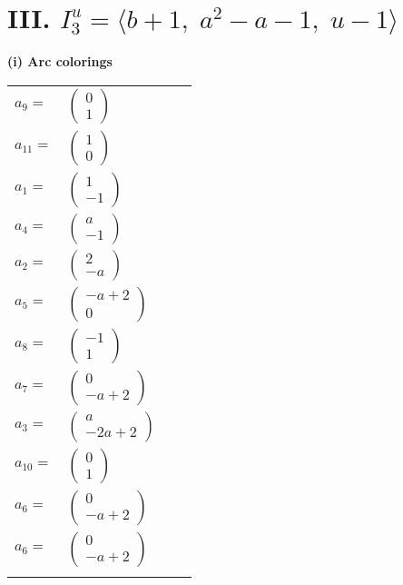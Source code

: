 \documentclass[1p]{elsarticle_modified}
\theoremstyle{definition}
\begin{document}
\centering \section*{III. $I^u_{3}= \langle b+1,\;a^2- a-1,\;u-1 \rangle$}
\flushleft \textbf{(i) Arc colorings}\\
\begin{tabular}{m{7pt} m{180pt} m{7pt} m{180pt} }
\flushright $a_{9}=$&$\begin{pmatrix}0\\1\end{pmatrix}$ \\
\flushright $a_{11}=$&$\begin{pmatrix}1\\0\end{pmatrix}$ \\
\flushright $a_{1}=$&$\begin{pmatrix}1\\-1\end{pmatrix}$ \\
\flushright $a_{4}=$&$\begin{pmatrix}a\\-1\end{pmatrix}$ \\
\flushright $a_{2}=$&$\begin{pmatrix}2\\- a\end{pmatrix}$ \\
\flushright $a_{5}=$&$\begin{pmatrix}- a+2\\0\end{pmatrix}$ \\
\flushright $a_{8}=$&$\begin{pmatrix}-1\\1\end{pmatrix}$ \\
\flushright $a_{7}=$&$\begin{pmatrix}0\\- a+2\end{pmatrix}$ \\
\flushright $a_{3}=$&$\begin{pmatrix}a\\-2 a+2\end{pmatrix}$ \\
\flushright $a_{10}=$&$\begin{pmatrix}0\\1\end{pmatrix}$ \\
\flushright $a_{6}=$&$\begin{pmatrix}0\\- a+2\end{pmatrix}$\\ \flushright $a_{6}=$&$\begin{pmatrix}0\\- a+2\end{pmatrix}$\\&\end{tabular}
\end{document}
